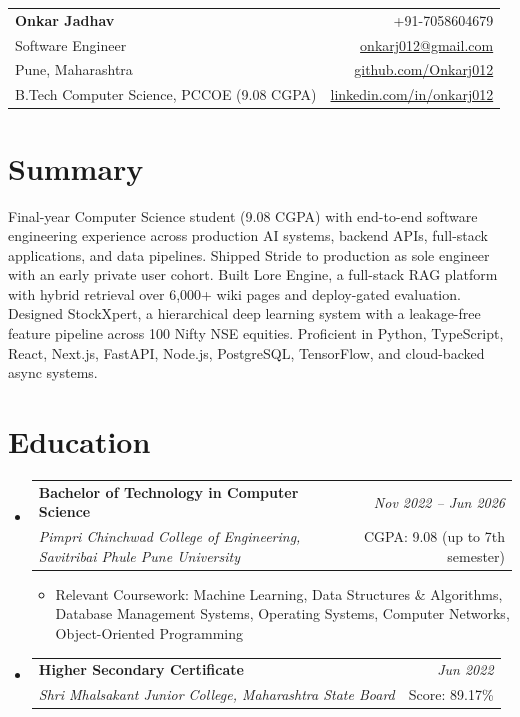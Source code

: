 \documentclass[a4paper,11pt]{article}
\makeatletter
\newcommand{\resumeSubheading}[4]{
\vspace{0.5mm}\item
    \begin{tabular*}{0.98\textwidth}[t]{l@{\extracolsep{\fill}}r}
        \textbf{#1} & \textit{\footnotesize{#4}} \\
        \textit{\footnotesize{#3}} & \footnotesize{#2}\\
    \end{tabular*}
    \vspace{-2.4mm}
}
\newcommand{\resumeSubHeadingListStart}{\begin{itemize}[leftmargin=*,labelsep=0mm]}
\newcommand{\resumeItemListStart}{\begin{justify}\begin{itemize}[leftmargin=3ex, rightmargin=2ex, noitemsep,labelsep=1.2mm,itemsep=0mm]\small}
\newcommand{\resumeSubHeadingListEnd}{\end{itemize}\vspace{2mm}}
\newcommand{\resumeItemListEnd}{\end{itemize}\end{justify}\vspace{-2mm}}
\newcommand{\name}{Onkar Jadhav}
\newcommand{\phone}{7058604679}
\newcommand{\emaila}{onkarj012@gmail.com}
\newcommand{\github}{github.com/Onkarj012}
\newcommand{\linkedin}{linkedin.com/in/onkarj012}
\makeatother
\begin{document}
\selectfont

\begin{tabularx}{\linewidth}{L r}
  \textbf{\Large \name} & {+91-\phone}\\
  {Software Engineer} & \href{mailto:\emaila}{\emaila} \\
  {Pune, Maharashtra} & \href{https://\github}{\github} \\
  {B.Tech Computer Science, PCCOE (9.08 CGPA)} & \href{https://\linkedin}{\linkedin}
\end{tabularx}
\vspace{-4mm}

\section{\textbf{Summary}}
\vspace{1mm}
\small{
Final-year Computer Science student (9.08 CGPA) with end-to-end software engineering experience across production AI systems, backend APIs, full-stack applications, and data pipelines. Shipped Stride to production as sole engineer with an early private user cohort. Built Lore Engine, a full-stack RAG platform with hybrid retrieval over 6,000+ wiki pages and deploy-gated evaluation. Designed StockXpert, a hierarchical deep learning system with a leakage-free feature pipeline across 100 Nifty NSE equities. Proficient in Python, TypeScript, React, Next.js, FastAPI, Node.js, PostgreSQL, TensorFlow, and cloud-backed async systems.
}
\vspace{-3mm}

\section{\textbf{Education}}
  \resumeSubHeadingListStart
    \resumeSubheading
      {Bachelor of Technology in Computer Science}{CGPA: 9.08 (up to 7th semester)}
      {Pimpri Chinchwad College of Engineering, Savitribai Phule Pune University}{Nov 2022 -- Jun 2026}
      \resumeItemListStart
        \item {Relevant Coursework: Machine Learning, Data Structures \& Algorithms, Database Management Systems, Operating Systems, Computer Networks, Object-Oriented Programming}
      \resumeItemListEnd
    \resumeSubheading
      {Higher Secondary Certificate}{Score: 89.17\%}
      {Shri Mhalsakant Junior College, Maharashtra State Board}{Jun 2022}
  \resumeSubHeadingListEnd
\vspace{-5.5mm}
\end{document}
